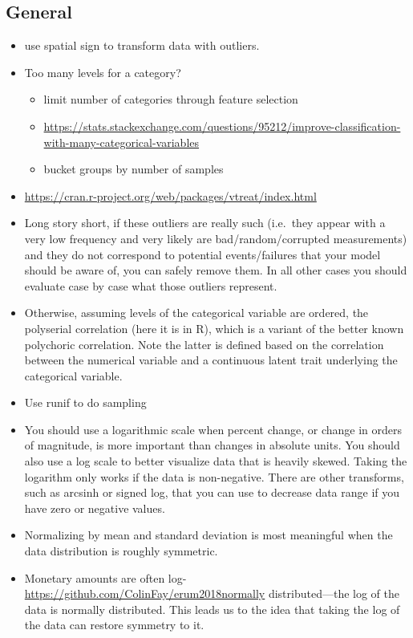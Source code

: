 \documentclass[]{book}
\providecommand{\tightlist}{%
  \setlength{\itemsep}{0pt}\setlength{\parskip}{0pt}}
\theoremstyle{definition}
\theoremstyle{definition}
\theoremstyle{definition}
\theoremstyle{remark}
\begin{document}
\subsection{General}\label{general-2}

\begin{itemize}
\item
  use spatial sign to transform data with outliers.
\item
  Too many levels for a category?

  \begin{itemize}
  \tightlist
  \item
    limit number of categories through feature selection
  \item
    \url{https://stats.stackexchange.com/questions/95212/improve-classification-with-many-categorical-variables}
  \item
    bucket groups by number of samples
  \end{itemize}
\item
  \url{https://cran.r-project.org/web/packages/vtreat/index.html}
\item
  Long story short, if these outliers are really such (i.e.~they appear
  with a very low frequency and very likely are bad/random/corrupted
  measurements) and they do not correspond to potential events/failures
  that your model should be aware of, you can safely remove them. In all
  other cases you should evaluate case by case what those outliers
  represent.
\item
  Otherwise, assuming levels of the categorical variable are ordered,
  the polyserial correlation (here it is in R), which is a variant of
  the better known polychoric correlation. Note the latter is defined
  based on the correlation between the numerical variable and a
  continuous latent trait underlying the categorical variable.
\item
  Use runif to do sampling
\item
  You should use a logarithmic scale when percent change, or change in
  orders of magnitude, is more important than changes in absolute units.
  You should also use a log scale to better visualize data that is
  heavily skewed. Taking the logarithm only works if the data is
  non-negative. There are other transforms, such as arcsinh or signed
  log, that you can use to decrease data range if you have zero or
  negative values.
\item
  Normalizing by mean and standard deviation is most meaningful when the
  data distribution is roughly symmetric.
\item
  Monetary amounts are often
  log-\url{https://github.com/ColinFay/erum2018normally}
  distributed---the log of the data is normally distributed. This leads
  us to the idea that taking the log of the data can restore symmetry to
  it.
\end{itemize}
\end{document}
